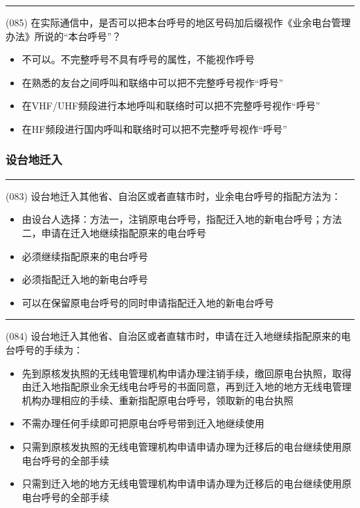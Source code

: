 \documentclass[twocolumn,hyperref,UTF8]{ctexart}  %
\begin{document}
\noindent\rule{0.5\textwidth}{1pt}
\heiti (085) 在实际通信中，是否可以把本台呼号的地区号码加后缀视作《业余电台管理办法》所说的“本台呼号”？ \songti {\color{gray} [LK1072] }
\begin{itemize}
	\item  不可以。不完整呼号不具有呼号的属性，不能视作呼号
	\item  在熟悉的友台之间呼叫和联络中可以把不完整呼号视作“呼号”
	\item  在VHF/UHF频段进行本地呼叫和联络时可以把不完整呼号视作“呼号”
	\item  在HF频段进行国内呼叫和联络时可以把不完整呼号视作“呼号”
\end{itemize}


\subsubsection{设台地迁入}


\noindent\rule{0.5\textwidth}{1pt}
\heiti (083) 设台地迁入其他省、自治区或者直辖市时，业余电台呼号的指配方法为： \songti {\color{gray} [LK0091] }
\begin{itemize}
	\item  由设台人选择：方法一，注销原电台呼号，指配迁入地的新电台呼号；方法二，申请在迁入地继续指配原来的电台呼号
	\item  必须继续指配原来的电台呼号
	\item  必须指配迁入地的新电台呼号
	\item  可以在保留原电台呼号的同时申请指配迁入地的新电台呼号
\end{itemize}


\noindent\rule{0.5\textwidth}{1pt}
\heiti (084) 设台地迁入其他省、自治区或者直辖市时，申请在迁入地继续指配原来的电台呼号的手续为： \songti {\color{gray} [LK0092] }
\begin{itemize}
	\item  先到原核发执照的无线电管理机构申请办理注销手续，缴回原电台执照，取得由迁入地指配原业余无线电台呼号的书面同意，再到迁入地的地方无线电管理机构办理相应的手续、重新指配原电台呼号，领取新的电台执照
	\item  不需办理任何手续即可把原电台呼号带到迁入地继续使用
	\item  只需到原核发执照的无线电管理机构申请申请办理为迁移后的电台继续使用原电台呼号的全部手续
	\item  只需到迁入地的地方无线电管理机构申请申请办理为迁移后的电台继续使用原电台呼号的全部手续
\end{itemize}
\end{document}
